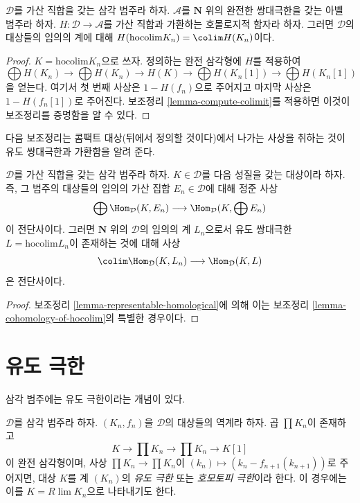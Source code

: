 \begin{lemma}
\label{lemma-cohomology-of-hocolim}
$\mathcal{D}$를 가산 직합을 갖는 삼각 범주라 하자.
$\mathcal{A}$를 $\mathbf{N}$ 위의 완전한 쌍대극한을 갖는
아벨 범주라 하자. $H : \mathcal{D} \to \mathcal{A}$를 가산
직합과 가환하는 호몰로지적 함자라 하자. 그러면
$\mathcal{D}$의 대상들의 임의의 계에 대해
$H(\text{hocolim} K_n) = \colim H(K_n)$이다.
\end{lemma}

\begin{proof}
$K = \text{hocolim} K_n$으로 쓰자. 정의하는 완전 삼각형에 $H$를
적용하여
$$
\bigoplus H(K_n) \to \bigoplus H(K_n)
\to H(K) \to
\bigoplus H(K_n[1]) \to \bigoplus H(K_n[1])
$$
을 얻는다. 여기서 첫 번째 사상은 $1 - H(f_n)$으로 주어지고
마지막 사상은 $1 - H(f_n[1])$로 주어진다. 보조정리
\ref{lemma-compute-colimit}를 적용하면 이것이 보조정리를 증명함을
알 수 있다.
\end{proof}

\noindent
다음 보조정리는 콤팩트 대상(뒤에서 정의할 것이다)에서 나가는 사상을
취하는 것이 유도 쌍대극한과 가환함을 알려 준다.

\begin{lemma}
\label{lemma-commutes-with-countable-sums}
$\mathcal{D}$를 가산 직합을 갖는 삼각 범주라 하자.
$K \in \mathcal{D}$를 다음 성질을 갖는 대상이라 하자. 즉,
그 범주의 대상들의 임의의 가산 집합 $E_n \in \mathcal{D}$에
대해 정준 사상
$$
\bigoplus \Hom_\mathcal{D}(K, E_n)
\longrightarrow
\Hom_\mathcal{D}(K, \bigoplus E_n)
$$
이 전단사이다. 그러면 $\mathbf{N}$ 위의 $\mathcal{D}$의 임의의 계
$L_n$으로서 유도 쌍대극한 $L = \text{hocolim} L_n$이 존재하는 것에
대해 사상
$$
\colim \Hom_\mathcal{D}(K, L_n) \longrightarrow \Hom_\mathcal{D}(K, L)
$$
은 전단사이다.
\end{lemma}

\begin{proof}
보조정리 \ref{lemma-representable-homological}에 의해 이는 보조정리
\ref{lemma-cohomology-of-hocolim}의 특별한 경우이다.
\end{proof}

\section{유도 극한}
\label{section-derived-limit}

\noindent
삼각 범주에는 유도 극한이라는 개념이 있다.

\begin{definition}
\label{definition-derived-limit}
$\mathcal{D}$를 삼각 범주라 하자.
$(K_n, f_n)$을 $\mathcal{D}$의 대상들의 역계라 하자.
곱 $\prod K_n$이 존재하고
$$
K \to \prod K_n \to \prod K_n \to K[1]
$$
이 완전 삼각형이며, 사상 $\prod K_n \to \prod K_n$이
$(k_n) \mapsto (k_n - f_{n + 1}(k_{n + 1}))$로 주어지면, 대상 $K$를
계 $(K_n)$의 {\it 유도 극한} 또는 {\it 호모토피 극한}이라 한다.
이 경우에는 이를 $K = R\lim K_n$으로 나타내기도 한다.
\end{definition}

